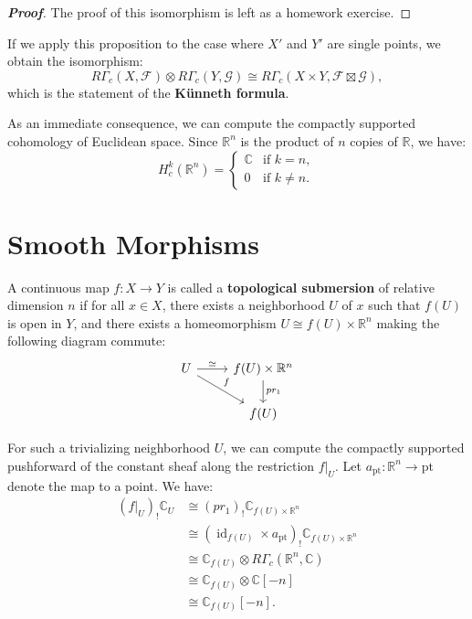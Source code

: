 \begin{proof}[\textbf{Proof}]
The proof of this isomorphism is left as a homework exercise.
\end{proof}

If we apply this proposition to the case where $X'$ and $Y'$ are single points, we obtain the isomorphism:
\begin{equation}\label{3.kunneth}
    R\Gamma_c(X, \mathcal{F}) \otimes R\Gamma_c(Y, \mathcal{G}) \cong R\Gamma_c(X \times Y, \mathcal{F} \boxtimes \mathcal{G}),  
\end{equation}
which is the statement of the \textbf{Künneth formula}. 

As an immediate consequence, we can compute the compactly supported cohomology of Euclidean space. Since $\mathbb{R}^n$ is the product of $n$ copies of $\mathbb{R}$, we have:
\begin{equation*}
    H_c^k(\mathbb{R}^n) = 
    \begin{cases} 
        \mathbb{C} & \text{if } k = n, \\ 
        0 & \text{if } k \neq n. 
    \end{cases}
\end{equation*}

\section{Smooth Morphisms}

\begin{definition}
A continuous map $f \colon X \longrightarrow Y$ is called a \textbf{topological submersion} of relative dimension $n$ if for all $x \in X$, there exists a neighborhood $U$ of $x$ such that $f(U)$ is open in $Y$, and there exists a homeomorphism $U \cong f(U) \times \mathbb{R}^n$ making the following diagram commute:
\[
\begin{tikzcd}
    U \arrow[r, "\simeq"] \arrow[rd, "f"] & f(U)\times\mathbb{R}^n \arrow[d, "pr_1"] \\
                                      & f(U)       
\end{tikzcd}
\]
\end{definition}

For such a trivializing neighborhood $U$, we can compute the compactly supported pushforward of the constant sheaf along the restriction $f|_U$. Let $a_{\text{pt}} \colon \mathbb{R}^n \longrightarrow \text{pt}$ denote the map to a point. We have:
\begin{align*}
    (f|_U)_! \mathbb{C}_U &\cong (pr_1)_! \mathbb{C}_{f(U) \times \mathbb{R}^n} \\
    &\cong (\operatorname{id}_{f(U)} \times a_{\text{pt}})_! \mathbb{C}_{f(U) \times \mathbb{R}^n} \\
    &\cong \mathbb{C}_{f(U)} \otimes R\Gamma_c(\mathbb{R}^n, \mathbb{C}) \\
    &\cong \mathbb{C}_{f(U)} \otimes \mathbb{C}[-n] \\
    &\cong \mathbb{C}_{f(U)}[-n].
\end{align*}


